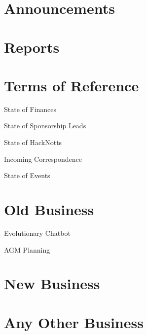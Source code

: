 \documentclass[11pt,hacksoc,agenda]{meetingmins}
\begin{document}
\maketitle

\section{Announcements}

\section{Reports}

\section{Terms of Reference}
\begin{items}
\item {State of Finances}
\item {State of Sponsorship Leads}
\item {State of HackNotts}
\item {Incoming Correspondence}
\item {State of Events}
\end{items}

\section{Old Business}
\begin{items}
\item Evolutionary Chatbot
\item AGM Planning
\end{items}

\section{New Business}

\section{Any Other Business}

\vspace{1em}
\end{document}
